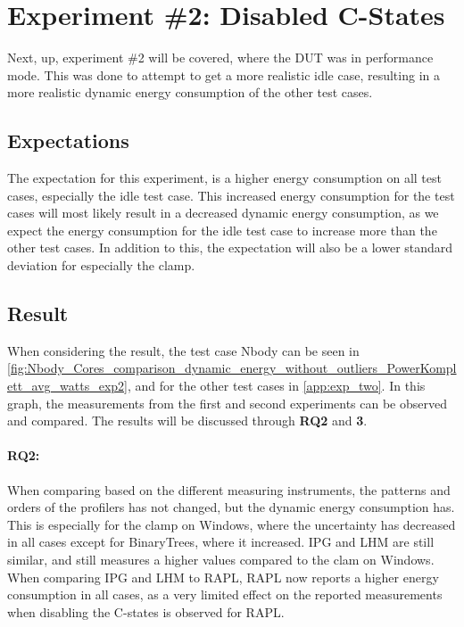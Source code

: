 \section{Experiment \#2: Disabled C-States}\label{sec:disable_c_states_exp}

Next, up, experiment \#2 will be covered, where the DUT was in performance mode. This was done to attempt to get a more realistic idle case, resulting in a more realistic dynamic energy consumption of the other test cases.

\subsection{Expectations} 

The expectation for this experiment, is a higher energy consumption on all test cases, especially the idle test case. This increased energy consumption for the test cases will most likely result in a decreased dynamic energy consumption, as we expect the energy consumption for the idle test case to increase more than the other test cases. In addition to this, the expectation will also be a lower standard deviation for especially the clamp.

\subsection{Result} 
When considering the result, the test case Nbody can be seen in \cref{fig:Nbody_Cores_comparison_dynamic_energy_without_outliers_PowerKomplett_avg_watts_exp2}, and for the other test cases in \cref{app:exp_two}. In this graph, the measurements from the first and second experiments can be observed and compared. The results will be discussed through \textbf{RQ2} and \textbf{3}.

\paragraph*{RQ2:} When comparing based on the different measuring instruments, the patterns and orders of the profilers has not changed, but the dynamic energy consumption has. This is especially for the clamp on Windows, where the uncertainty has decreased in all cases except for BinaryTrees, where it increased. IPG and LHM are still similar, and still measures a higher values compared to the clam on Windows. When comparing IPG and LHM to RAPL, RAPL now reports a higher energy consumption in all cases, as a very limited effect on the reported measurements when disabling the C-states is observed for RAPL.

